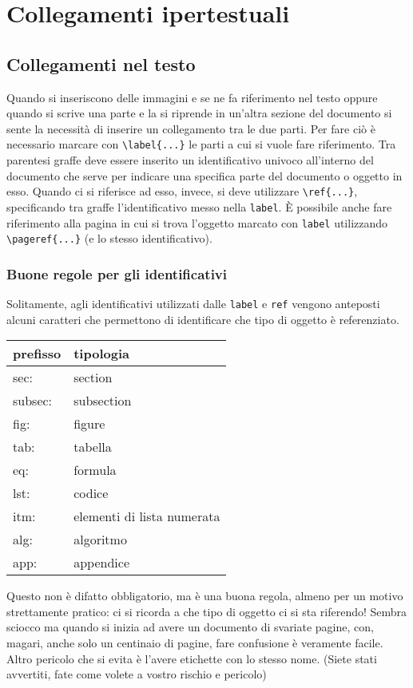 \section{Collegamenti ipertestuali}

\subsection{Collegamenti nel testo}
Quando si inseriscono delle immagini e se ne fa riferimento nel testo oppure 
quando si scrive una parte e la si riprende in un'altra sezione del documento 
si sente la necessità di inserire un collegamento tra le due parti. Per fare 
ciò è necessario marcare con \verb!\label{...}! le parti a cui si vuole fare 
riferimento. Tra parentesi graffe deve essere inserito un identificativo 
univoco all'interno del documento che serve per indicare una specifica parte 
del documento o oggetto in esso. Quando ci si riferisce ad esso, invece, si 
deve utilizzare \verb!\ref{...}!, specificando tra graffe l'identificativo 
messo nella \verb!label!. È possibile anche fare riferimento alla pagina in 
cui si trova l'oggetto marcato con \verb!label! utilizzando 
\verb!\pageref{...}! (e lo stesso identificativo).

\subsubsection{Buone regole per gli identificativi}
Solitamente, agli identificativi utilizzati dalle \verb!label! e \verb!ref! 
vengono anteposti alcuni caratteri che permettono di identificare che tipo di 
oggetto è referenziato. 
\begin{table}[]
\centering
\begin{tabular}{ll}
\hline
\textbf{prefisso} & \textbf{tipologia}         \\ \hline
sec:              & section                    \\ \hline
subsec:           & subsection                 \\ \hline
fig:              & figure                     \\ \hline
tab:              & tabella                    \\ \hline
eq:               & formula                    \\ \hline
lst:              & codice                     \\ \hline
itm:              & elementi di lista numerata \\ \hline
alg:              & algoritmo                  \\ \hline
app:              & appendice                  \\ \hline
\end{tabular}
\end{table}
Questo non è difatto obbligatorio, ma è una buona regola, almeno per un motivo 
strettamente pratico: ci si ricorda a che tipo di oggetto ci si sta riferendo! 
Sembra sciocco ma quando si inizia ad avere un documento di svariate pagine, 
con, magari, anche solo un centinaio di pagine, fare confusione è veramente 
facile. Altro pericolo che si evita è l'avere etichette con lo stesso nome. 
(Siete stati avvertiti, fate come volete a vostro rischio e pericolo)


